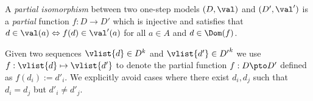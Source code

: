A \emph{partial isomorphism} between two one-step models %
$(D,\val)$ and $(D',\val')$ is a \emph{partial} function $f: D \to D'$ which is injective and satisfies that $d \in \val(a) \Leftrightarrow f(d) \in \val'(a)$ for all $a\in A$ and $ d\in \Dom(f)$.

Given two sequences $\vlist{d} \in D^k$ and $\vlist{d'} \in {D'}^k$ 
we use $f:\vlist{d} \mapsto \vlist{d'}$ to denote the partial function $f:D\pto D'$ defined as $f(d_i) := d'_i$. We explicitly avoid cases where there exist $d_i,d_j$ such that $d_i = d_j$ but $d'_i \neq d'_j$.


